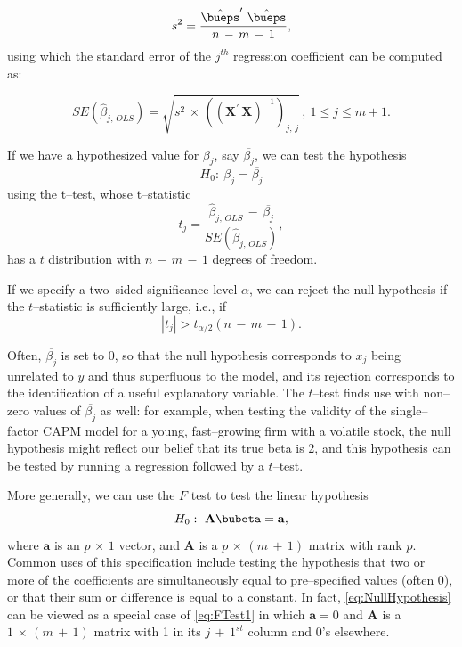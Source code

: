 \documentclass[graybox,envcountchap,sectrefs]{svmono}\usepackage[]{graphicx}\usepackage[]{xcolor}
\begin{document}
\begin{appendices}
\begin{equation}
s^{2}=\frac{\hat{\bueps}^{\prime}\ \hat{\bueps}}{n\,-\,m\,-\,1},\label{eq:sSquared}
\end{equation}
using which the standard error of the $j^{th}$ regression coefficient
can be computed as:

\begin{equation}
SE\left(\hat{\beta}_{j,\,OLS}\right)=\sqrt{s^{2}\,\times\,\left(\left(\mathrm{\mathbf{X}}^{\prime}\,\mathrm{\mathbf{X}}\right)^{-1}\right)_{j,\,j}}\,,\ 1\leqslant j\leqslant m+1.\label{eq:SEofBetaj}
\end{equation}

If we have a hypothesized value for $\beta_{j}$, say $\overline{\beta_{j}}$,
we can test the hypothesis
\begin{equation}
H_{0}:\ \beta_{j}=\overline{\beta_{j}}\label{eq:NullHypothesis}
\end{equation}
using the t--test, whose t--statistic
\begin{equation}
t_{j}=\frac{\hat{\beta}_{j,\,OLS}\,-\,\overline{\beta_{j}}}{SE\left(\hat{\beta}_{j,\,OLS}\right)},\label{eq:tStatRegression}
\end{equation}
has a $t$ distribution with $n\,-\,m\,-\,1$ degrees of freedom.

If we specify a two--sided significance level $\alpha$, we can reject
the null hypothesis if the $t$--statistic is sufficiently large,
i.e., if
\begin{equation}
|t_{j}|>t_{\alpha/2}\left(n\,-\,m\,-\,1\right).\label{eq:tTestRegression}
\end{equation}

Often, $\overline{\beta_{j}}$ is set to 0, so that the null hypothesis
corresponds to $x_{j}$ being unrelated to $y$ and thus superfluous
to the model, and its rejection corresponds to the identification
of a useful explanatory variable. The $t$--test finds use with non--zero
values of $\overline{\beta_{j}}$ as well: for example, when testing
the validity of the single--factor CAPM model for a young, fast--growing
firm with a volatile stock, the null hypothesis might reflect our
belief that its true beta is 2, and this hypothesis can be tested
by running a regression followed by a $t$--test.

More generally, we can use the $F$ test to test the linear hypothesis
\begin{equation}
H_{0}:\ \mathrm{\mathbf{A}}\bubeta=\mathrm{\mathbf{a}},\label{eq:FTest1}
\end{equation}
where $\mathrm{\mathbf{a}}$ is an $p\,\times\,1$ vector, and $\mathrm{\mathbf{A}}$
is a $p\,\times\,\left(m\,+\,1\right)$ matrix with rank $p$. Common
uses of this specification include testing the hypothesis that two
or more of the coefficients are simultaneously equal to pre--specified
values (often 0), or that their sum or difference is equal to a constant.
In fact, \eqref{eq:NullHypothesis} can be viewed as a special case
of \eqref{eq:FTest1} in which $\mathrm{\mathbf{a}}=0$ and $\mathbf{A}$
is a $1\,\times\,\left(m\,+\,1\right)$ matrix with 1 in its $j\,+\,1^{st}$
column and 0's elsewhere.


\end{appendices}
\end{document}
